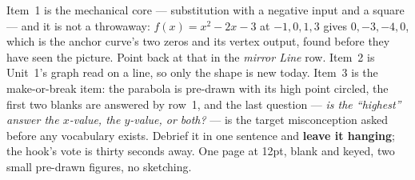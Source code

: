 \documentclass[10pt]{article}
\begin{document}
\begin{teachernote}[Warm-Up]
Item~1 is the mechanical core --- substitution with a negative input and a square --- and it is
not a throwaway: $f(x)=x^2-2x-3$ at $-1,0,1,3$ gives $0,-3,-4,0$, which is the anchor curve's two
zeros and its vertex output, found before they have seen the picture. Point back at that in the
\emph{mirror Line} row. Item~2 is Unit~1's graph read on a line, so only the shape is new today.
Item~3 is the make-or-break item: the parabola is pre-drawn with its high point circled, the first
two blanks are answered by row~1, and the last question --- \emph{is the ``highest'' answer the
$x$-value, the $y$-value, or both?} --- is the target misconception asked before any vocabulary
exists. Debrief it in one sentence and \textbf{leave it hanging}; the hook's vote is thirty
seconds away. One page at 12pt, blank and keyed, two small pre-drawn figures, no sketching.
\end{teachernote}
\end{document}

